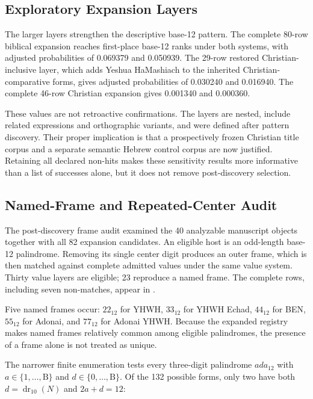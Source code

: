 \subsection{Exploratory Expansion Layers}

The larger layers strengthen the descriptive base-12 pattern. The complete 80-row biblical expansion reaches first-place base-12 ranks under both systems, with adjusted probabilities of 0.069379 and 0.050939. The 29-row restored Christian-inclusive layer, which adds Yeshua HaMashiach to the inherited Christian-comparative forms, gives adjusted probabilities of 0.030240 and 0.016940. The complete 46-row Christian expansion gives 0.001340 and 0.000360.

These values are not retroactive confirmations. The layers are nested, include related expressions and orthographic variants, and were defined after pattern discovery. Their proper implication is that a prospectively frozen Christian title corpus and a separate semantic Hebrew control corpus are now justified. Retaining all declared non-hits makes these sensitivity results more informative than a list of successes alone, but it does not remove post-discovery selection.

\subsection{Named-Frame and Repeated-Center Audit}

The post-discovery frame audit examined the 40 analyzable manuscript objects together with all 82 expansion candidates. An eligible host is an odd-length base-12 palindrome. Removing its single center digit produces an outer frame, which is then matched against complete admitted values under the same value system. Thirty value layers are eligible; 23 reproduce a named frame. The complete rows, including seven non-matches, appear in .

Five named frames occur: $22_{12}$ for YHWH, $33_{12}$ for YHWH Echad, $44_{12}$ for BEN, $55_{12}$ for Adonai, and $77_{12}$ for Adonai YHWH. Because the expanded registry makes named frames relatively common among eligible palindromes, the presence of a frame alone is not treated as unique.

The narrower finite enumeration tests every three-digit palindrome $ada_{12}$ with $a\in\{1,\ldots,\mathrm{B}\}$ and $d\in\{0,\ldots,\mathrm{B}\}$. Of the 132 possible forms, only two have both $d=\operatorname{dr}_{10}(N)$ and $2a+d=12$:


